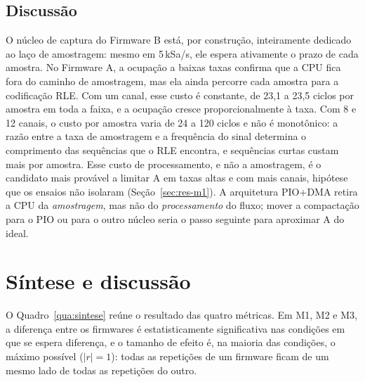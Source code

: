 \subsection{Discussão}

O núcleo de captura do Firmware B está, por construção, inteiramente
dedicado ao laço de amostragem: mesmo em 5\,kSa/s, ele espera ativamente o
prazo de cada amostra. No Firmware A, a ocupação a baixas taxas confirma que
a \ac{CPU} fica fora do caminho de amostragem, mas ela ainda percorre cada
amostra para a codificação \ac{RLE}. Com um canal, esse custo é constante,
de 23,1 a 23,5 ciclos por amostra em toda a faixa, e a ocupação cresce
proporcionalmente à taxa. Com 8 e 12 canais, o custo por amostra varia de 24
a 120 ciclos e não é monotônico: a razão entre a taxa de amostragem e a
frequência do sinal determina o comprimento das sequências que o \ac{RLE}
encontra, e sequências curtas custam mais por amostra. Esse custo de
processamento, e não a amostragem, é o candidato mais provável a limitar A em
taxas altas e com mais canais, hipótese que os ensaios não isolaram
(Seção~\ref{sec:res-m1}). A arquitetura \ac{PIO}+\ac{DMA} retira a \ac{CPU}
da \emph{amostragem}, mas não do \emph{processamento} do fluxo; mover a
compactação para o \ac{PIO} ou para o outro núcleo seria o passo seguinte
para aproximar A do ideal.

\section{Síntese e discussão}\label{sec:res-sintese}

O Quadro~\ref{qua:sintese} reúne o resultado das quatro métricas. Em M1, M2
e M3, a diferença entre os firmwares é estatisticamente significativa nas
condições em que se espera diferença, e o tamanho de efeito é, na
maioria das condições, o máximo possível ($|r| = 1$): todas as repetições
de um firmware ficam de um mesmo lado de todas as repetições do outro.

